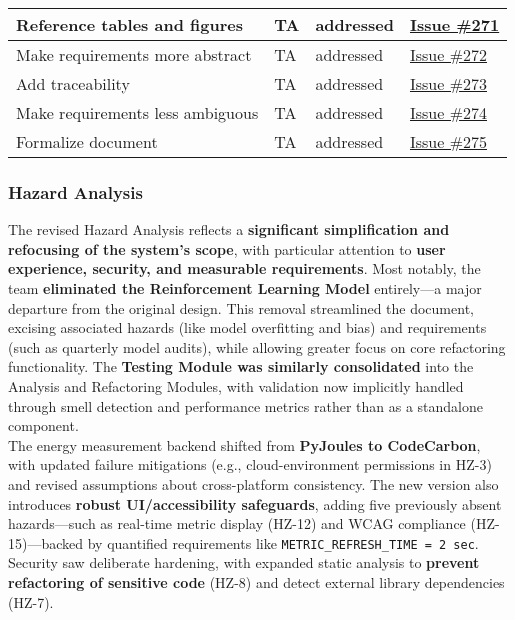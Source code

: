 \documentclass{article}
\begin{document}
\begin{longtable}[H]{|p{5cm}|p{2cm}|p{5cm}|p{3cm}|}
    Reference tables and figures & TA & addressed & \href{https://github.com/ssm-lab/capstone--source-code-optimizer/issues/271}{Issue \#271} \\ \hline
    Make requirements more abstract & TA & addressed & \href{https://github.com/ssm-lab/capstone--source-code-optimizer/issues/272}{Issue \#272} \\ \hline
    Add traceability & TA & addressed & \href{https://github.com/ssm-lab/capstone--source-code-optimizer/issues/273}{Issue \#273} \\ \hline
    Make requirements less ambiguous & TA & addressed & \href{https://github.com/ssm-lab/capstone--source-code-optimizer/issues/274}{Issue \#274} \\ \hline
    Formalize document & TA & addressed & \href{https://github.com/ssm-lab/capstone--source-code-optimizer/issues/275}{Issue \#275} \\ \hline
\end{longtable}

\subsubsection{Hazard Analysis}

The revised Hazard Analysis reflects a \textbf{significant simplification and refocusing of the system's scope}, with particular attention to \textbf{user experience, security, and measurable requirements}. Most notably, the team \textbf{eliminated the Reinforcement Learning Model} entirely—a major departure from the original design. This removal streamlined the document, excising associated hazards (like model overfitting and bias) and requirements (such as quarterly model audits), while allowing greater focus on core refactoring functionality. The \textbf{Testing Module was similarly consolidated} into the Analysis and Refactoring Modules, with validation now implicitly handled through smell detection and performance metrics rather than as a standalone component.\\

The energy measurement backend shifted from \textbf{PyJoules to CodeCarbon}, with updated failure mitigations (e.g., cloud-environment permissions in HZ-3) and revised assumptions about cross-platform consistency. The new version also introduces \textbf{robust UI/accessibility safeguards}, adding five previously absent hazards—such as real-time metric display (HZ-12) and WCAG compliance (HZ-15)—backed by quantified requirements like \texttt{METRIC\_REFRESH\_TIME = 2 sec}. Security saw deliberate hardening, with expanded static analysis to \textbf{prevent refactoring of sensitive code} (HZ-8) and detect external library dependencies (HZ-7).\\
\end{document}
